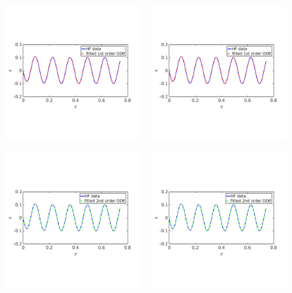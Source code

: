 \documentclass[10pt,xcolor=dvipsnames,compress]{beamer}
\begin{document}
\begin{frame}
\begin{figure}
\includegraphics[trim = 0.in  2.3in 0.in 2.8in, clip, width=0.45\textwidth]{figs/Isin_high_epsfit_1st.png}
~
\includegraphics[trim = 0.in  2.3in 0.in 2.8in, clip, width=0.45\textwidth]{figs/Isin_high_epsfit_1st.png}
\end{figure}

\vspace{-0.18in}

\begin{figure}
\includegraphics[trim = 0.in  2.3in 0.in 2.8in, clip, width=0.45\textwidth]{figs/Isin_high_epsfit_2nd.png}
~
\includegraphics[trim = 0.in  2.3in 0.in 2.8in, clip, width=0.45\textwidth]{figs/Isin_high_epsfit_2nd.png}
\end{figure}


\vfill
\end{frame}
\end{document}
